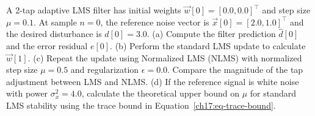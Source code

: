 \begin{exercise}
A 2-tap adaptive LMS filter has initial weights $\vec{w}[0] = [0.0, 0.0]^\top$ and step size $\mu = 0.1$. At sample $n=0$, the reference noise vector is $\vec{x}[0] = [2.0, 1.0]^\top$ and the desired disturbance is $d[0] = 3.0$.
(a) Compute the filter prediction $\hat{d}[0]$ and the error residual $e[0]$.
(b) Perform the standard LMS update to calculate $\vec{w}[1]$.
(c) Repeat the update using Normalized LMS (NLMS) with normalized step size $\mu = 0.5$ and regularization $\epsilon = 0.0$. Compare the magnitude of the tap adjustment between LMS and NLMS.
(d) If the reference signal is white noise with power $\sigma_x^2 = 4.0$, calculate the theoretical upper bound on $\mu$ for standard LMS stability using the trace bound in Equation~\eqref{ch17:eq-trace-bound}.
\end{exercise}
